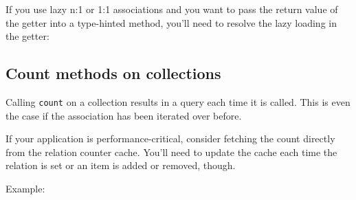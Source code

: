 If you use lazy n:1 or 1:1 associations and you want to pass the return value of the getter into a type-hinted method, you'll need to resolve the lazy loading in the getter:



\subsection{Count methods on collections}
\label{relation-count}

Calling \texttt{count} on a collection results in a query each time it is called. This is even the case if the association has been iterated over before.

If your application is performance-critical, consider fetching the count directly from the relation counter cache. You'll need to update the cache each time the relation is set or an item is added or removed, though.

Example:

